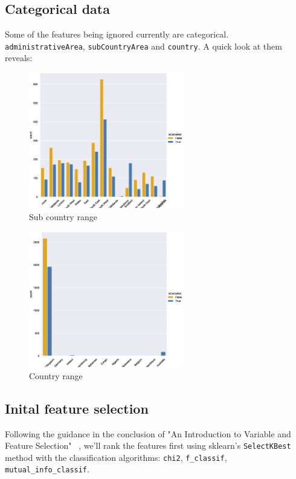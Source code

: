 \documentclass[runningheads]{llncs}
\begin{document}
\subsection{Categorical data}
Some of the features being ignored currently are categorical. \texttt{administrativeArea}, \texttt{subCountryArea} and \texttt{country}. A quick look at them reveals:
\begin{figure}
\centering
\includegraphics[width=0.6\textwidth]{catagoricalSubCountryArea.eps}
\caption{\label{fig:overleaf}Sub country range}
\end{figure}
\begin{figure}
\centering
\includegraphics[width=0.6\textwidth]{catagoricalCountry.eps}
\caption{\label{fig:overleaf}Country range}
\end{figure}


\subsection{Inital feature selection}
Following the guidance in the conclusion of "An Introduction to Variable and Feature Selection" ~\cite{ref_url5}, we'll rank the features first using sklearn's \texttt{SelectKBest} method with the classification algorithms: \texttt{chi2}, \texttt{f_classif}, \texttt{mutual_info_classif}. 
\end{document}

